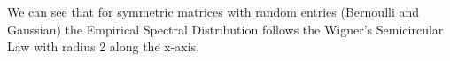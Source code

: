 \documentclass[10pt]{article}
\begin{document}
\begin{flushleft}
\begin{figure}[!htb]
\begin{floatrow}
    \end{floatrow}
\end{figure}
\begin{figure}[!htb]
    \begin{floatrow}
    \end{floatrow}
\end{figure}
\vspace{10em}
We can see that for symmetric matrices with random entries (Bernoulli and Gaussian) the Empirical Spectral Distribution follows the Wigner's Semicircular Law with radius 2 along the x-axis.
\end{flushleft}
\end{document}
